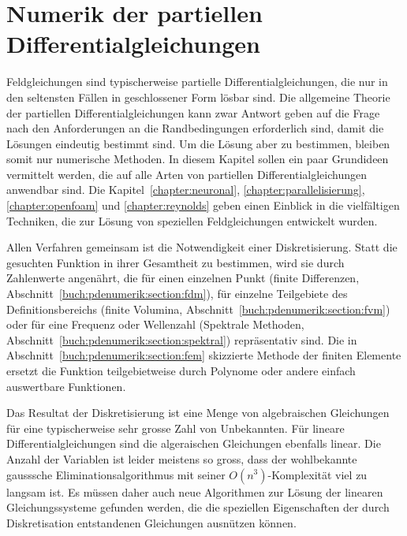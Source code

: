 %
%
%
\chapter{Numerik der partiellen Differentialgleichungen
\label{chapter:pdenumerik}}

\noindent
Feldgleichungen sind typischerweise partielle Differentialgleichungen,
die nur in den seltensten Fällen in geschlossener Form lösbar sind.
Die allgemeine Theorie der partiellen Differentialgleichungen kann
zwar Antwort geben auf die Frage nach den Anforderungen an die
Randbedingungen erforderlich sind, damit
die Lösungen eindeutig bestimmt sind. 
Um die Lösung aber zu bestimmen, bleiben somit nur numerische Methoden.
In diesem Kapitel sollen ein paar Grundideen vermittelt werden, die
auf alle Arten von partiellen Differentialgleichungen anwendbar sind.
Die Kapitel~\ref{chapter:neuronal},
\ref{chapter:parallelisierung},
\ref{chapter:openfoam}
und
\ref{chapter:reynolds}
geben einen Einblick in die vielfältigen Techniken, die zur Lösung
von speziellen Feldgleichungen entwickelt wurden.

Allen Verfahren gemeinsam ist die Notwendigkeit einer Diskretisierung.
Statt die gesuchten Funktion in ihrer Gesamtheit zu bestimmen, wird sie
durch Zahlenwerte angenährt, die für einen einzelnen Punkt
(finite Differenzen, Abschnitt~\ref{buch:pdenumerik:section:fdm}),
für einzelne Teilgebiete des Definitionsbereichs
(finite Volumina, Abschnitt~\ref{buch:pdenumerik:section:fvm})
oder für eine Frequenz oder Wellenzahl (Spektrale Methoden,
Abschnitt~\ref{buch:pdenumerik:section:spektral})
repräsentativ sind.
Die in Abschnitt~\ref{buch:pdenumerik:section:fem} skizzierte
Methode der finiten Elemente ersetzt die Funktion teilgebietweise
durch Polynome oder andere einfach auswertbare Funktionen.

Das Resultat der Diskretisierung ist eine Menge von algebraischen
Gleichungen für eine typischerweise sehr grosse Zahl von Unbekannten.
Für lineare Differentialgleichungen sind die algeraischen Gleichungen
ebenfalls linear.
Die Anzahl der Variablen ist leider meistens so gross, dass der
wohlbekannte gausssche Eliminationsalgorithmus mit seiner
$O(n^3)$-Komplexität viel zu langsam ist.
Es müssen daher auch neue Algorithmen zur Lösung der linearen
Gleichungssysteme gefunden werden, die die speziellen Eigenschaften
der durch Diskretisation entstandenen Gleichungen ausnützen können.








